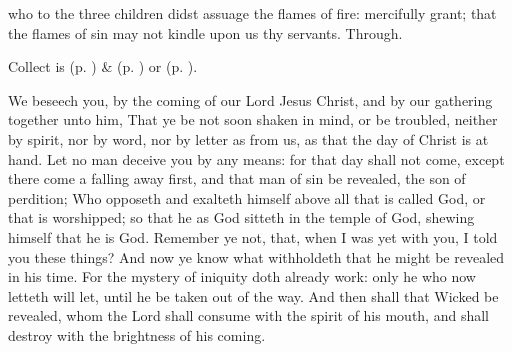 
\collect
{} who to the three children didst assuage the flames of fire: mercifully grant; that the flames of sin may not kindle upon us thy servants. Through.

\begin{rubric}
     Collect is  (p. \pageref{SPMaryInAdvent}) \&   (p. \pageref{SPAgainst}) or  (p. \pageref{SPChiefBishop}).
\end{rubric}

 We beseech you, by the coming of our Lord Jesus Christ, and by our gathering together unto him, That ye be not soon shaken in mind, or be troubled, neither by spirit, nor by word, nor by letter as from us, as that the day of Christ is at hand. Let no man deceive you by any means: for that day shall not come, except there come a falling away first, and that man of sin be revealed, the son of perdition; Who opposeth and exalteth himself above all that is called God, or that is worshipped; so that he as God sitteth in the temple of God, shewing himself that he is God. Remember ye not, that, when I was yet with you, I told you these things? And now ye know what withholdeth that he might be revealed in his time. For the mystery of iniquity doth already work: only he who now letteth will let, until he be taken out of the way. And then shall that Wicked be revealed, whom the Lord shall consume with the spirit of his mouth, and shall destroy with the brightness of his coming.


